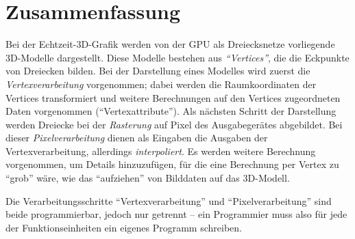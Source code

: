 \documentclass[twoside,a4paper,fleqn,12pt]{book}
\begin{document}
\section{Zusammenfassung}

Bei der Echtzeit-3D-Grafik werden von der GPU als Dreiecksnetze vorliegende 3D-Modelle dargestellt.
Diese Modelle bestehen aus \emph{``Vertices''}, die die Eckpunkte von Dreiecken bilden. Bei der Darstellung eines
Modelles wird zuerst die \emph{Vertexverarbeitung} vorgenommen; dabei werden die Raumkoordinaten der Vertices transformiert
und weitere Berechnungen auf den Vertices zugeordneten Daten vorgenommen ("`Vertexattribute"').
Als nächsten Schritt der Darstellung werden Dreiecke bei der \emph{Rasterung} auf Pixel des Ausgabegerätes abgebildet.
Bei dieser \emph{Pixelverarbeitung} dienen als Eingaben die Ausgaben der Vertexverarbeitung, allerdings \emph{interpoliert}.
Es werden weitere Berechnung vorgenommen, um Details hinzuzufügen, für die eine Berechnung per Vertex zu "`grob"' wäre,
wie das "`aufziehen"' von Bilddaten auf das 3D-Modell.

Die Verarbeitungsschritte "`Vertexverarbeitung"' und "`Pixelverarbeitung"' sind beide programmierbar, 
jedoch nur getrennt -- ein Programmier muss also für jede der Funktionseinheiten ein eigenes Programm schreiben.



\end{document}
